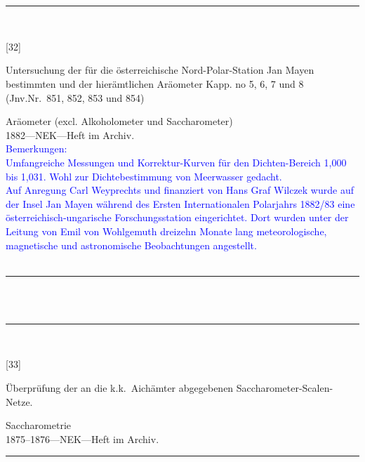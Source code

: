 \\
\vspace*{-2.5pt}\\
\parbox{\textwidth}{%
\rule{\textwidth}{1pt}\vspace*{-3mm}\\
\begin{minipage}[t]{0.15\textwidth}\vspace{0pt}
\Huge\rule[-4mm]{0cm}{1cm}[32]
\end{minipage}
\hfill
\begin{minipage}[t]{0.85\textwidth}\vspace{0pt}
\large Untersuchung der für die österreichische Nord-Polar-Station {\glqq}Jan Mayen{\grqq} bestimmten und der hierämtlichen Aräometer Kapp. no 5, 6, 7 und 8 (Jnv.Nr.~851, 852, 853 und 854)\rule[-2mm]{0mm}{2mm}
\end{minipage}
{\footnotesize\flushright
Aräometer (excl. Alkoholometer und Saccharometer)\\
}
1882\quad---\quad NEK\quad---\quad Heft im Archiv.\\
\textcolor{blue}{Bemerkungen:\\{}
Umfangreiche Messungen und Korrektur-Kurven für den Dichten-Bereich 1,000 bis 1,031. Wohl zur Dichtebestimmung von Meerwasser gedacht.\\{}
Auf Anregung Carl Weyprechts und finanziert von Hans Graf Wilczek wurde auf der Insel Jan Mayen während des Ersten Internationalen Polarjahrs 1882/83 eine österreichisch-ungarische Forschungsstation eingerichtet. Dort wurden unter der Leitung von Emil von Wohlgemuth dreizehn Monate lang meteorologische, magnetische und astronomische Beobachtungen angestellt.\\{}
}
\\[-15pt]
\rule{\textwidth}{1pt}
}
\\
\vspace*{-2.5pt}\\
\parbox{\textwidth}{%
\rule{\textwidth}{1pt}\vspace*{-3mm}\\
\begin{minipage}[t]{0.15\textwidth}\vspace{0pt}
\Huge\rule[-4mm]{0cm}{1cm}[33]
\end{minipage}
\hfill
\begin{minipage}[t]{0.85\textwidth}\vspace{0pt}
\large Überprüfung der an die k.k.\ Aichämter abgegebenen Saccharometer-Scalen-Netze.\rule[-2mm]{0mm}{2mm}
\end{minipage}
{\footnotesize\flushright
Saccharometrie\\
}
1875--1876\quad---\quad NEK\quad---\quad Heft im Archiv.\\
\rule{\textwidth}{1pt}
}

